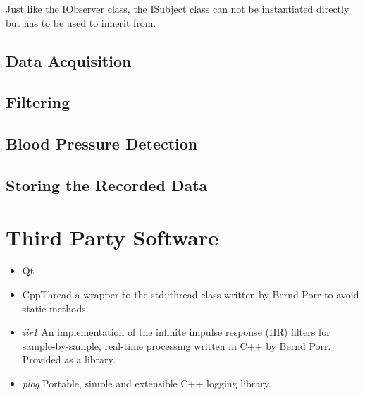Just like the IObserver class, the ISubject class can not be instantiated directly but has to be used to inherit from. 

\subsection{Data Acquisition}
\subsection{Filtering}
\subsection{Blood Pressure Detection}
\subsection{Storing the Recorded Data}

\section{Third Party Software}

\begin{itemize}
\item Qt %
\item CppThread a wrapper to the std::thread class written by Bernd Porr to avoid static methods. %
\item \emph{iir1} An implementation of the infinite impulse response (IIR) filters for sample-by-sample, real-time processing written in C++ by Bernd Porr. Provided as a library.%
\item \emph{plog} Portable, simple and extensible C++ logging library. %
\end{itemize}

